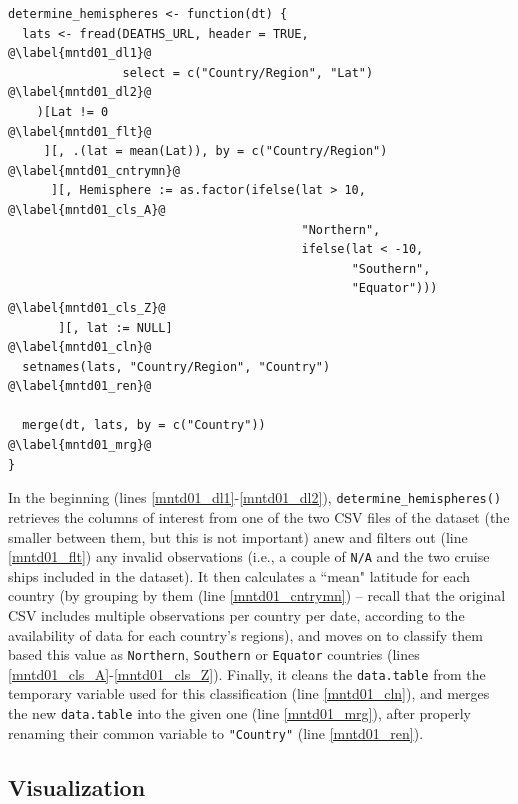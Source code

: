 \begin{verbatim}
determine_hemispheres <- function(dt) {
  lats <- fread(DEATHS_URL, header = TRUE,                    @\label{mntd01_dl1}@
                select = c("Country/Region", "Lat")           @\label{mntd01_dl2}@
    )[Lat != 0                                                @\label{mntd01_flt}@
     ][, .(lat = mean(Lat)), by = c("Country/Region")         @\label{mntd01_cntrymn}@
      ][, Hemisphere := as.factor(ifelse(lat > 10,            @\label{mntd01_cls_A}@
                                         "Northern",
                                         ifelse(lat < -10,
                                                "Southern",
                                                "Equator")))  @\label{mntd01_cls_Z}@
       ][, lat := NULL]                                       @\label{mntd01_cln}@
  setnames(lats, "Country/Region", "Country")                 @\label{mntd01_ren}@

  merge(dt, lats, by = c("Country"))                          @\label{mntd01_mrg}@
}
\end{verbatim}

In the beginning (lines \ref{mntd01_dl1}-\ref{mntd01_dl2}), \texttt{determine\_hemispheres()} retrieves the columns of interest from one of the two CSV files of the dataset (the smaller between them, but this is not important) anew and filters out (line \ref{mntd01_flt}) any invalid observations (i.e., a couple of \texttt{N/A} and the two cruise ships included in the dataset).
It then calculates a ``mean" latitude for each country (by grouping by them (line \ref{mntd01_cntrymn}) -- recall that the original CSV includes multiple observations per country per date, according to the availability of data for each country's regions), and moves on to classify them based this value as \texttt{Northern}, \texttt{Southern} or \texttt{Equator} countries (lines \ref{mntd01_cls_A}-\ref{mntd01_cls_Z}).
Finally, it cleans the \texttt{data.table} from the temporary variable used for this classification (line \ref{mntd01_cln}), and merges the new \texttt{data.table} into the given one (line \ref{mntd01_mrg}), after properly renaming their common variable to \texttt{"Country"} (line \ref{mntd01_ren}).


\subsection{Visualization}

